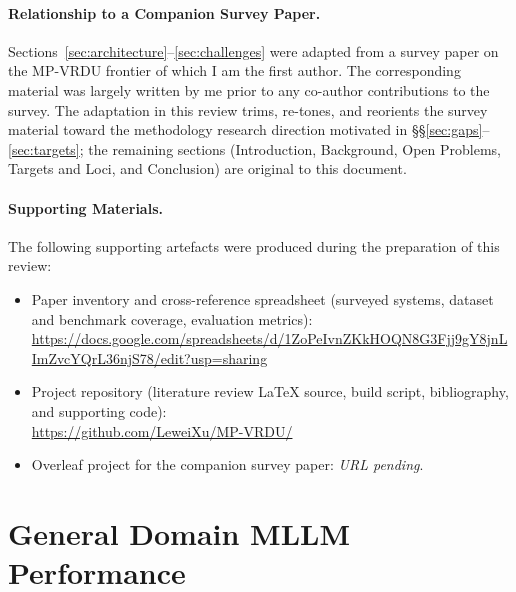 \documentclass[11pt]{article}
\begin{document}
\paragraph{Relationship to a Companion Survey Paper.}
Sections~\ref{sec:architecture}--\ref{sec:challenges} were adapted from a survey paper on the MP-VRDU frontier of which I am the first author. The corresponding material was largely written by me prior to any co-author contributions to the survey. The adaptation in this review trims, re-tones, and reorients the survey material toward the methodology research direction motivated in \S\S\ref{sec:gaps}--\ref{sec:targets}; the remaining sections (Introduction, Background, Open Problems, Targets and Loci, and Conclusion) are original to this document.

\paragraph{Supporting Materials.}
The following supporting artefacts were produced during the preparation of this review:
\begin{itemize}
  \item Paper inventory and cross-reference spreadsheet (surveyed systems, dataset and benchmark coverage, evaluation metrics): \\ \url{https://docs.google.com/spreadsheets/d/1ZoPeIvnZKkHOQN8G3Fjj9gY8jnLImZvcYQrL36njS78/edit?usp=sharing}
  \item Project repository (literature review \LaTeX{} source, build script, bibliography, and supporting code): \\ \url{https://github.com/LeweiXu/MP-VRDU/}
  \item Overleaf project for the companion survey paper: \emph{URL pending}.
\end{itemize}



\appendix

\section{General Domain MLLM Performance}
\label{app:general-mllm}
\end{document}
